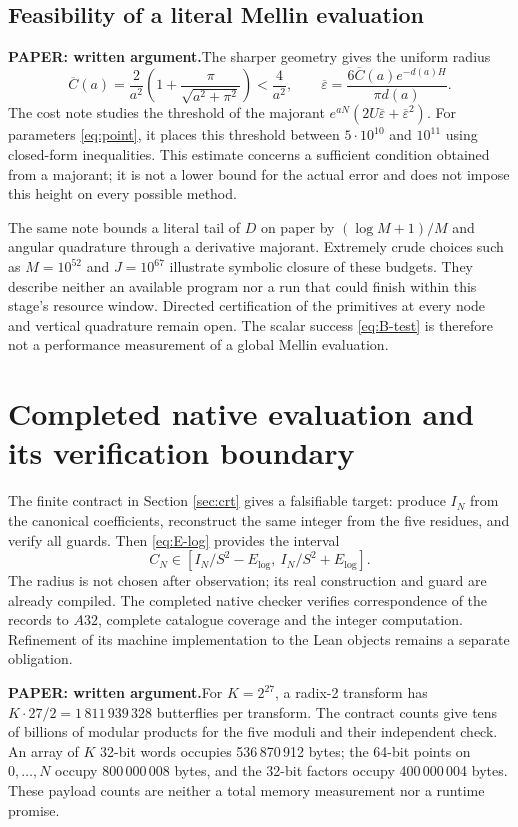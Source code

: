 \documentclass[11pt,a4paper]{article}
\theoremstyle{remark}
\newcommand{\paper}{\textbf{PAPER: written argument.}\space}
\begin{document}
\subsection*{Feasibility of a literal Mellin evaluation}
\paper The sharper geometry gives the uniform radius
\[
\overline C(a)=\frac2{a^2}\left(1+
\frac{\pi}{\sqrt{a^2+\pi^2}}\right)<\frac4{a^2},\qquad
\overline\varepsilon=
\frac{6\overline C(a)e^{-d(a)H}}{\pi d(a)}.
\]
The cost note studies the threshold of the majorant
$e^{aN}(2U\overline\varepsilon+\overline\varepsilon^2)$.
For parameters \eqref{eq:point}, it places this threshold between
$5\cdot10^{10}$ and $10^{11}$ using closed-form inequalities.
This estimate concerns a sufficient condition obtained from a majorant;
it is not a lower bound for the actual error and does not impose this
height on every possible method.

The same note bounds a literal tail of $D$ on paper by $(\log M+1)/M$
and angular quadrature through a derivative majorant. Extremely crude
choices such as $M=10^{52}$ and $J=10^{67}$ illustrate symbolic closure
of these budgets. They describe neither an available program nor a run
that could finish within this stage's resource window. Directed certification
of the primitives at every node and vertical quadrature remain open.
The scalar success \eqref{eq:B-test} is therefore not a performance
measurement of a global Mellin evaluation.

\clearpage
\section{Completed native evaluation and its verification boundary}\label{sec:numeric}
The finite contract in Section \ref{sec:crt} gives a falsifiable target:
produce $I_N$ from the canonical coefficients, reconstruct the same integer
from the five residues, and verify all guards. Then \eqref{eq:E-log}
provides the interval
\[
C_N\in\left[I_N/S^2-E_{\log},\ I_N/S^2+E_{\log}\right].
\]
The radius is not chosen after observation; its real construction and guard
are already compiled. The completed native checker verifies correspondence
of the records to $A32$, complete catalogue coverage and the integer
computation. Refinement of its machine implementation to the Lean objects
remains a separate obligation.

\paper For $K=2^{27}$, a radix-2 transform has
$K\cdot27/2=1\,811\,939\,328$ butterflies per transform. The contract counts
give tens of billions of modular products for the five moduli and their
independent check. An array of $K$ 32-bit words occupies 536\,870\,912 bytes;
the 64-bit points on $0,\ldots,N$ occupy 800\,000\,008 bytes, and the 32-bit
factors occupy 400\,000\,004 bytes. These payload counts are neither a total
memory measurement nor a runtime promise.
\end{document}
